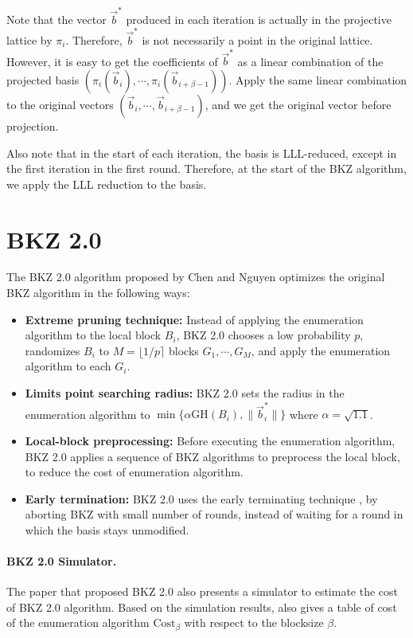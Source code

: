 \documentclass[11pt]{article}
\newcommand{\vb}{\vec{b}}
\newcommand{\vbs}{\vec{b}^*}
\newcommand{\GH}{\mathrm{GH}}
\newcommand{\Costbeta}{\mathrm{Cost}_{\beta}}
\begin{document}
Note that the vector $\vbs$ produced in each iteration is actually in the projective lattice by $\pi_i$.
Therefore, $\vbs$ is not necessarily a point in the original lattice.
However, it is easy to get the coefficients of $\vbs$ as a linear combination of the projected basis $(\pi_i(\vb_i),\cdots,\pi_i(\vb_{i+\beta-1}))$.
Apply the same linear combination to the original vectors $(\vb_i,\cdots,\vb_{i+\beta-1})$, and we get the original vector before projection.

Also note that in the start of each iteration, the basis is LLL-reduced, except in the first iteration in the first round.
Therefore, at the start of the BKZ algorithm, we apply the LLL reduction to the basis.

\section{BKZ 2.0}
\label{sec:bkz2}

The BKZ 2.0 algorithm proposed by Chen and Nguyen \cite{cn2011bkz} optimizes the original BKZ algorithm in the following ways:

\begin{itemize}
	\item \textbf{Extreme pruning technique:} Instead of applying the enumeration algorithm to the local block $B_i$, BKZ 2.0 chooses a low probability $p$, randomizes $B_i$ to $M=\lfloor 1/p\rceil$ blocks $G_1,\cdots,G_M$, and apply the enumeration algorithm to each $G_i$.
	\item \textbf{Limits point searching radius:} BKZ 2.0 sets the radius in the enumeration algorithm to $\min\{\alpha\GH(B_i),\|\vb_i^*\|\}$ where $\alpha=\sqrt{1.1}$.
	\item \textbf{Local-block preprocessing:} Before executing the enumeration algorithm, BKZ 2.0 applies a sequence of BKZ algorithms to preprocess the local block, to reduce the cost of enumeration algorithm.
	\item \textbf{Early termination:} BKZ 2.0 uses the early terminating technique \cite{hps2011analyzing}, by aborting BKZ with small number of rounds, instead of waiting for a round in which the basis stays unmodified.
\end{itemize}

\paragraph{BKZ 2.0 Simulator.} The paper \cite{cn2011bkz} that proposed BKZ 2.0 also presents a simulator to estimate the cost of BKZ 2.0 algorithm.
Based on the simulation results, \cite{cn2011bkz} also gives a table of cost of the enumeration algorithm $\Costbeta$ with respect to the blocksize $\beta$.
\end{document}
